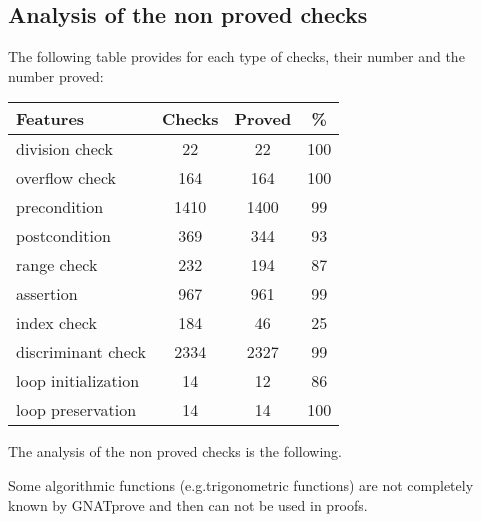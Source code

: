 \documentclass[10pt,a4paper,twocolumn]{article}
\newcommand{\gnatprove}{GNATprove\xspace}
\begin{document}
\subsection{Analysis of the non proved checks}

The following table provides for each type of checks, their number and the number proved:

\vspace{5mm}

\begin{tabular}{|l|c|c|c|}
\hline
Features            & Checks & Proved & \%  \\
\hline
division check      & 22     & 22     & 100 \\
\hline
overflow check      & 164    & 164    & 100 \\
\hline
precondition        & 1410   & 1400   & 99  \\
\hline
postcondition       & 369    & 344    & 93  \\
\hline
range check         & 232    & 194    & 87  \\
\hline
assertion           & 967    & 961    & 99  \\
\hline
index check         & 184    & 46     & 25  \\
\hline
discriminant check  & 2334   & 2327   & 99  \\
\hline
loop initialization & 14     & 12     & 86  \\
\hline
loop  preservation  & 14     & 14     & 100 \\
\hline
\end{tabular}

\vspace{5mm}

The analysis of the non proved checks is the following.

Some algorithmic functions (e.g.trigonometric functions) are not completely known by \gnatprove and then can not be used in proofs.
\end{document}
